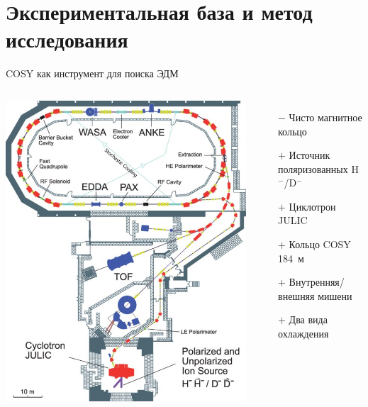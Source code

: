 \documentclass[14pt]{beamer}
\begin{document}
\section{Экспериментальная база и метод исследования}
\begin{frame}{COSY как инструмент для поиска ЭДМ}
	\begin{columns}
		\centering
		\includegraphics[width=\linewidth]{COSY_facility}
		\begin{itemize}
			\item[$-$] Чисто магнитное кольцо
			\item[$+$] Источник поляризованных H$^-$/D$^-$
			\item[$+$] Циклотрон JULIC
			\item[$+$] Кольцо COSY 184~м
			\item[$+$] Внутренняя/внешняя мишени
			\item[$+$] Два вида охлаждения
		\end{itemize}
	\end{columns}
	
\end{frame}
\end{document}
